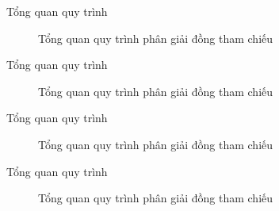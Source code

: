 \documentclass[9pt,xcolor=table,hyperref=unicode]{beamer}
\begin{document}
	\begin{frame}{Tổng quan quy trình}		
		\begin{figure}[H]
			\LARGE 
			\centering				
			\resizebox{100mm}{!}{}
			\caption{Tổng quan quy trình phân giải đồng tham chiếu}									
		\end{figure}
	\end{frame}

	\begin{frame}{Tổng quan quy trình}		
		\begin{figure}[H]
			\LARGE 
			\centering				
			\resizebox{100mm}{!}{}
			\caption{Tổng quan quy trình phân giải đồng tham chiếu}									
		\end{figure}
	\end{frame}

	\begin{frame}{Tổng quan quy trình}		
		\begin{figure}[H]
			\LARGE 
			\centering				
			\resizebox{100mm}{!}{}
			\caption{Tổng quan quy trình phân giải đồng tham chiếu}									
		\end{figure}
	\end{frame}

	\begin{frame}{Tổng quan quy trình}		
		\begin{figure}[H]
			\LARGE 
			\centering				
			\resizebox{100mm}{!}{}
			\caption{Tổng quan quy trình phân giải đồng tham chiếu}									
		\end{figure}
	\end{frame}
\end{document}
